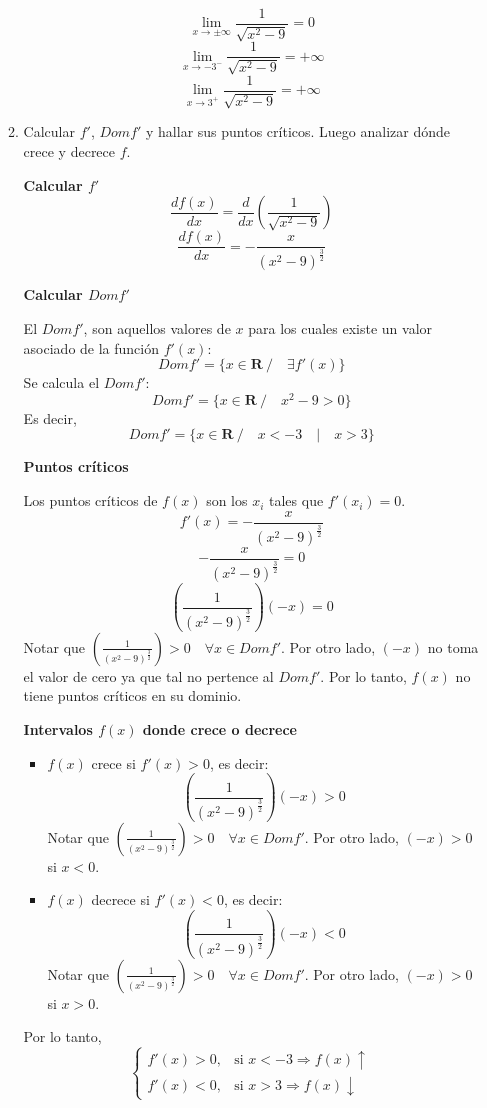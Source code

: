 \documentclass{article}
\begin{document}
\begin{enumerate}
\begin{enumerate}
        $$\lim_{x\to \pm \infty} \frac{1}{\sqrt{x^2-9}} = 0$$
        $$\lim_{x\to -3^-} \frac{1}{\sqrt{x^2-9}} = +\infty$$
        $$\lim_{x\to 3^+} \frac{1}{\sqrt{x^2-9}} = +\infty$$
      
        \item Calcular $f'$, $Domf'$ y hallar sus puntos críticos. Luego analizar dónde crece y decrece $f$.
      
        \textbf{Calcular $f'$}
        $$\frac{d f(x)}{dx} = \frac{d}{d x} \left(\frac{1}{\sqrt{x^2-9}} \right)$$
        $$\frac{d f(x)}{dx}= -\frac{x}{(x^2-9)^{\frac{3}{2}}}$$
      
        \textbf{Calcular $Domf'$}
      
        El $Domf'$, son aquellos valores de $x$ para los cuales existe un valor asociado de la función $f'(x)$:
        $$Domf' = \{ x \in \mathbf{R}\ / \quad \exists f'(x)\}$$
        Se calcula el $Domf'$:
        $$Domf'= \{ x \in \mathbf{R}\ / \quad x^2-9 > 0\}$$
        Es decir,
        $$Domf'= \{ x \in \mathbf{R}\ / \quad x<-3 \quad | \quad x>3 \}$$
      
        \textbf{Puntos críticos}
      
        Los puntos críticos de $f(x)$ son los $x_i$ tales que $f'(x_i) = 0$.
        $$f'(x) = -\frac{x}{(x^2-9)^{\frac{3}{2}}}$$
        $$-\frac{x}{(x^2-9)^{\frac{3}{2}}} = 0$$
        $$\left(\frac{1}{(x^2-9)^{\frac{3}{2}}} \right) (-x) = 0$$
        Notar que $\left(\frac{1}{(x^2-9)^{\frac{3}{2}}} \right) > 0 \quad \forall x \in Domf'$. Por otro lado, $(-x)$ no toma el valor de cero ya que tal no pertence al $Domf'$. Por lo tanto, $f(x)$ no tiene puntos críticos en su dominio.
      
        \textbf{Intervalos $f(x)$ donde crece o decrece}
        \begin{itemize}
            \item $f(x)$ crece si $f'(x) > 0$, es decir:
            $$\left(\frac{1}{(x^2-9)^{\frac{3}{2}}} \right) (-x) > 0$$
            Notar que $\left(\frac{1}{(x^2-9)^{\frac{3}{2}}} \right) > 0 \quad \forall x \in Domf'$. Por otro lado, $(-x) > 0$ si $x < 0$.
            \item $f(x)$ decrece si $f'(x) < 0$, es decir:
            $$\left(\frac{1}{(x^2-9)^{\frac{3}{2}}} \right) (-x) < 0$$
            Notar que $\left(\frac{1}{(x^2-9)^{\frac{3}{2}}} \right) > 0 \quad \forall x \in Domf'$. Por otro lado, $(-x) > 0$ si $x > 0$.
        \end{itemize}
        Por lo tanto,
        \begin{equation*}
            \begin{cases}
                f'(x)> 0, & \text{si $x < -3 \Rightarrow f(x) \uparrow$}\\
                f'(x)< 0, & \text{si $x > 3 \Rightarrow f(x) \downarrow$}
            \end{cases}
        \end{equation*}
      

\end{enumerate}
\end{enumerate}
\end{document}
